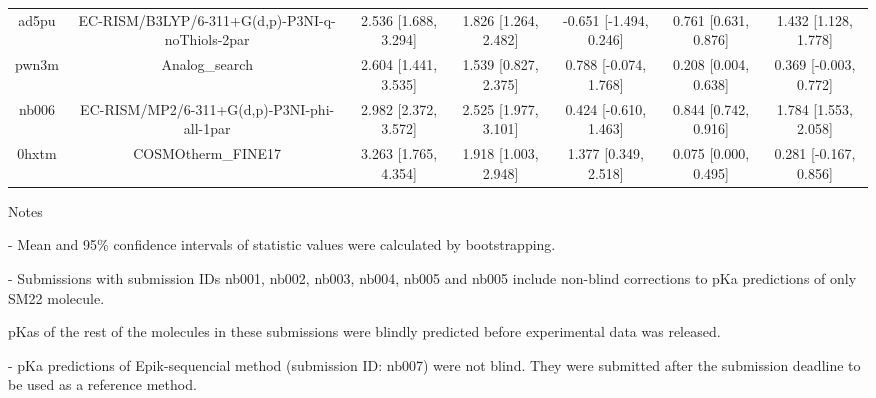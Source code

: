 \documentclass{article}
\begin{document}
\begin{center}
\begin{longtable}{|ccccccc|}
 ad5pu &    EC-RISM/B3LYP/6-311+G(d,p)-P3NI-q-noThiols-2par &  2.536 [1.688, 3.294] &  1.826 [1.264, 2.482] &   -0.651 [-1.494, 0.246] &  0.761 [0.631, 0.876] &   1.432 [1.128, 1.778] \\
 pwn3m &                                     Analog\_search &  2.604 [1.441, 3.535] &  1.539 [0.827, 2.375] &    0.788 [-0.074, 1.768] &  0.208 [0.004, 0.638] &  0.369 [-0.003, 0.772] \\
 nb006 &         EC-RISM/MP2/6-311+G(d,p)-P3NI-phi-all-1par &  2.982 [2.372, 3.572] &  2.525 [1.977, 3.101] &    0.424 [-0.610, 1.463] &  0.844 [0.742, 0.916] &   1.784 [1.553, 2.058] \\
 0hxtm &                                 COSMOtherm\_FINE17 &  3.263 [1.765, 4.354] &  1.918 [1.003, 2.948] &     1.377 [0.349, 2.518] &  0.075 [0.000, 0.495] &  0.281 [-0.167, 0.856] \\
\end{longtable}
\end{center}

Notes

- Mean and 95\% confidence intervals of statistic values were calculated by bootstrapping.

- Submissions with submission IDs nb001, nb002, nb003, nb004, nb005 and nb005 include non-blind corrections to pKa predictions of only SM22 molecule.

pKas of the rest of the molecules in these submissions were blindly predicted before experimental data was released.

- pKa predictions of Epik-sequencial method (submission ID: nb007) were not blind. They were submitted after the submission deadline to be used as a reference method.
\end{document}
